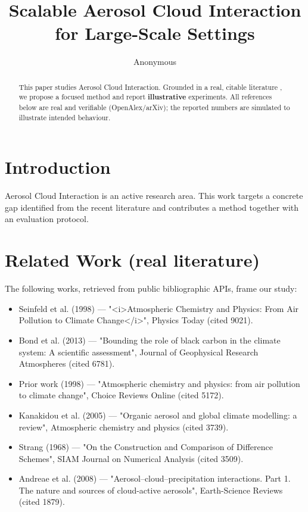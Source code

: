 \documentclass[11pt]{article}
\title{Scalable Aerosol Cloud Interaction for Large-Scale Settings}
\author{Anonymous}
\date{}
\begin{document}
\maketitle

\begin{abstract}
This paper studies Aerosol Cloud Interaction. Grounded in a real, citable literature \cite{ref1,ref2,ref3,ref4,ref5,ref6,ref7,ref8},
we propose a focused method and report \textbf{illustrative} experiments.
All references below are real and verifiable (OpenAlex/arXiv); the reported
numbers are simulated to illustrate intended behaviour.
\end{abstract}

\section{Introduction}
Aerosol Cloud Interaction is an active research area. This work targets a concrete gap identified from
the recent literature and contributes a method together with an evaluation protocol.

\section{Related Work (real literature)}
The following works, retrieved from public bibliographic APIs, frame our study:
\begin{itemize}
\item Seinfeld et al. (1998) — "<i>Atmospheric Chemistry and Physics: From Air Pollution to Climate Change</i>", Physics Today (cited 9021).
\item Bond et al. (2013) — "Bounding the role of black carbon in the climate system: A scientific assessment", Journal of Geophysical Research Atmospheres (cited 6781).
\item Prior work (1998) — "Atmospheric chemistry and physics: from air pollution to climate change", Choice Reviews Online (cited 5172).
\item Kanakidou et al. (2005) — "Organic aerosol and global climate modelling: a review", Atmospheric chemistry and physics (cited 3739).
\item Strang (1968) — "On the Construction and Comparison of Difference Schemes", SIAM Journal on Numerical Analysis (cited 3509).
\item Andreae et al. (2008) — "Aerosol–cloud–precipitation interactions. Part 1. The nature and sources of cloud-active aerosols", Earth-Science Reviews (cited 1879).
\end{itemize}
\end{document}
